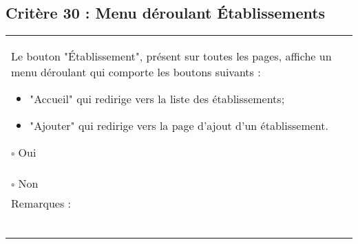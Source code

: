  		
  			\subsection*{Critère 30 : Menu déroulant Établissements}
	
	\begin{center}
    	 		\begin{tabular}[h]{|p{}|}
			\hline
				Le bouton "Établissement", présent sur toutes les pages, affiche un menu déroulant qui comporte les boutons suivants : 
				\begin{itemize}
					\item "Accueil" qui redirige vers la liste des établissements;
					\item "Ajouter" qui redirige vers la page d'ajout d'un établissement.
				\end{itemize}
				$\square$ Oui  \\ $\square$ Non \\\hline Remarques : \\ ~\\
			 \\\hline
     		\end{tabular}
  		\end{center}
  		
  		
  	